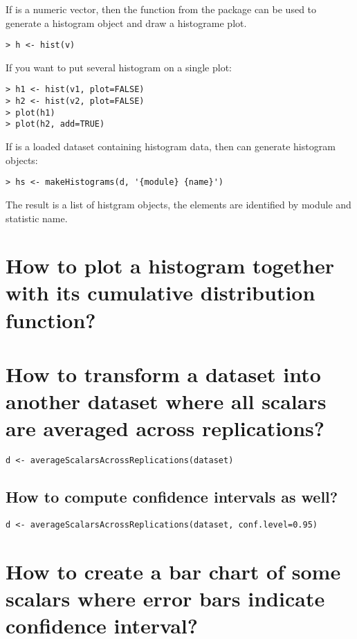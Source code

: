 If  is a numeric vector, then the  function from the  package
can be used to generate a histogram object and draw a histograme plot.

\begin{verbatim}
> h <- hist(v)
\end{verbatim}

If you want to put several histogram on a single plot:

\begin{verbatim}
> h1 <- hist(v1, plot=FALSE)
> h2 <- hist(v2, plot=FALSE)
> plot(h1)
> plot(h2, add=TRUE)
\end{verbatim}

If  is a loaded dataset containing histogram data, then  can generate
histogram objects:

\begin{verbatim}
> hs <- makeHistograms(d, '{module} {name}') 
\end{verbatim}

The result is a list of histgram objects, the elements are identified by module and statistic name.

\section{How to plot a histogram together with its cumulative distribution function?}

\section{How to transform a dataset into another dataset where all scalars are averaged across replications?}

\begin{verbatim}
d <- averageScalarsAcrossReplications(dataset)
\end{verbatim}

\subsection{How to compute confidence intervals as well?}

\begin{verbatim}
d <- averageScalarsAcrossReplications(dataset, conf.level=0.95)
\end{verbatim}

\section{How to create a bar chart of some scalars where error bars indicate confidence interval?}

